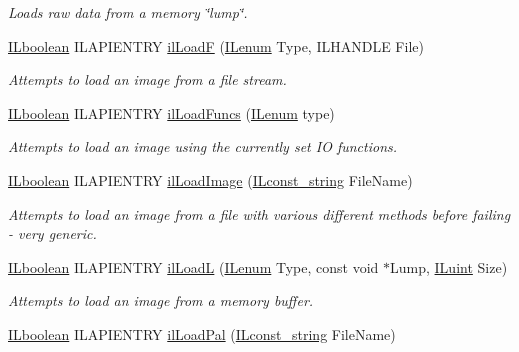 \begin{DoxyCompactItemize}
\begin{DoxyCompactList}\small\item\em Loads raw data from a memory \char`\"{}lump\char`\"{}. \end{DoxyCompactList}\item 
\hyperlink{group__il__types_gaa6aa7c95cfdc06b4d8601ef832b7bb0a}{I\+Lboolean} I\+L\+A\+P\+I\+E\+N\+T\+R\+Y \hyperlink{group__file_gaf4026be626ce1e62d6867ccee4afb607}{il\+Load\+F} (\hyperlink{group__il__types_ga62ca73445716183ef42b1f3906a45ed0}{I\+Lenum} Type, I\+L\+H\+A\+N\+D\+L\+E File)
\begin{DoxyCompactList}\small\item\em Attempts to load an image from a file stream. \end{DoxyCompactList}\item 
\hyperlink{group__il__types_gaa6aa7c95cfdc06b4d8601ef832b7bb0a}{I\+Lboolean} I\+L\+A\+P\+I\+E\+N\+T\+R\+Y \hyperlink{group__file_ga156c262317e404e53df7454a064973a3}{il\+Load\+Funcs} (\hyperlink{group__il__types_ga62ca73445716183ef42b1f3906a45ed0}{I\+Lenum} type)
\begin{DoxyCompactList}\small\item\em Attempts to load an image using the currently set I\+O functions. \end{DoxyCompactList}\item 
\hyperlink{group__il__types_gaa6aa7c95cfdc06b4d8601ef832b7bb0a}{I\+Lboolean} I\+L\+A\+P\+I\+E\+N\+T\+R\+Y \hyperlink{group__file_gace0d235c26455aa9ebe091b0af019a8f}{il\+Load\+Image} (\hyperlink{group__il__types_ga1aa1edc3eb344e14acacb02bade24a5a}{I\+Lconst\+\_\+string} File\+Name)
\begin{DoxyCompactList}\small\item\em Attempts to load an image from a file with various different methods before failing -\/ very generic. \end{DoxyCompactList}\item 
\hyperlink{group__il__types_gaa6aa7c95cfdc06b4d8601ef832b7bb0a}{I\+Lboolean} I\+L\+A\+P\+I\+E\+N\+T\+R\+Y \hyperlink{group__file_ga0417a8c1202ae4720d98b0fe3ecddfda}{il\+Load\+L} (\hyperlink{group__il__types_ga62ca73445716183ef42b1f3906a45ed0}{I\+Lenum} Type, const void $\ast$Lump, \hyperlink{group__il__types_gaff8e86a1072c8d7cfe387fb87c6ed8e1}{I\+Luint} Size)
\begin{DoxyCompactList}\small\item\em Attempts to load an image from a memory buffer. \end{DoxyCompactList}\item 
\hypertarget{group__file_gac412222fcdd3ae96b1d9de01c8e17a5a}{\hyperlink{group__il__types_gaa6aa7c95cfdc06b4d8601ef832b7bb0a}{I\+Lboolean} I\+L\+A\+P\+I\+E\+N\+T\+R\+Y \hyperlink{group__file_gac412222fcdd3ae96b1d9de01c8e17a5a}{il\+Load\+Pal} (\hyperlink{group__il__types_ga1aa1edc3eb344e14acacb02bade24a5a}{I\+Lconst\+\_\+string} File\+Name)}\label{group__file_gac412222fcdd3ae96b1d9de01c8e17a5a}


\end{DoxyCompactItemize}
